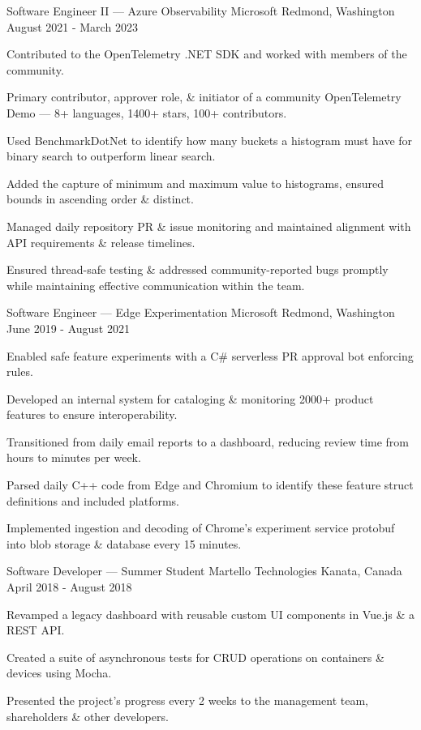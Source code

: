 
\begin{cventries}
	\cventry
		{Software Engineer II --- Azure Observability}
		{Microsoft}
		{Redmond, Washington}
		{August 2021 - March 2023}
		{\begin{cvitems}
			\item Contributed to the OpenTelemetry .NET SDK and worked with members of the community.
			\item Primary contributor, approver role, \& initiator of a community OpenTelemetry Demo --- 8+ languages, 1400+ stars, 100+ contributors.
			\item Used BenchmarkDotNet to identify how many buckets a histogram must have for binary search to outperform linear search.
			\item Added the capture of minimum and maximum value to histograms, ensured bounds in ascending order \& distinct.
			\item Managed daily repository PR \& issue monitoring and maintained alignment with API requirements \& release timelines.
			\item Ensured thread-safe testing \& addressed community-reported bugs promptly while maintaining effective communication within the team.
		\end{cvitems}}
		
	\cventry
		{Software Engineer --- Edge Experimentation}
		{Microsoft}
		{Redmond, Washington}
		{June 2019 - August 2021}
		{\begin{cvitems}
			\item Enabled safe feature experiments with a C\# serverless PR approval bot enforcing rules.
			\item Developed an internal system for cataloging \& monitoring 2000+ product features to ensure interoperability.
			\item Transitioned from daily email reports to a dashboard, reducing review time from hours to minutes per week.
			\item Parsed daily C++ code from Edge and Chromium to identify these feature struct definitions and included platforms.
			\item Implemented ingestion and decoding of Chrome's experiment service protobuf into blob storage \& database every 15 minutes.
		\end{cvitems}}

	\cventry
		{Software Developer --- Summer Student}
		{Martello Technologies}
		{Kanata, Canada}
		{April 2018 - August 2018}
		{\begin{cvitems}
			\item Revamped a legacy dashboard with reusable custom UI components in Vue.js \& a REST API.
			\item Created a suite of asynchronous tests for CRUD operations on containers \& devices using Mocha.
			\item Presented the project's progress every 2 weeks to the management team, shareholders \& other developers.
		\end{cvitems}}


\end{cventries}
